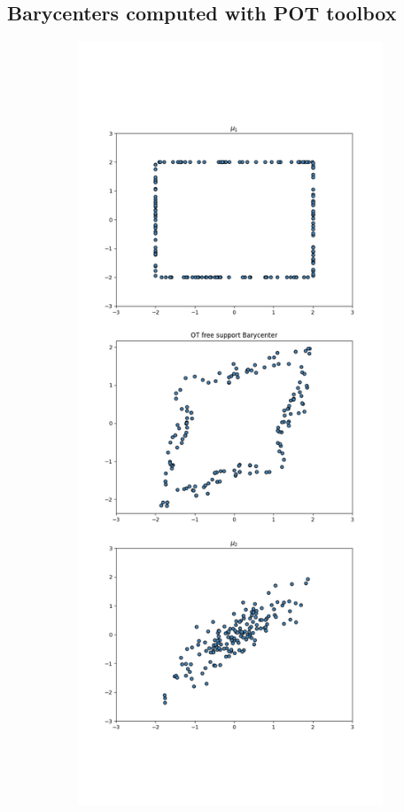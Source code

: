 \documentclass[a4paper, 11pt]{article}
\begin{document}
\subsection*{Barycenters computed with POT toolbox}
\begin{figure}[H]
    \begin{subfigure}{.5\textwidth}
        \centering
        \includegraphics[width=\textwidth]{figures/ot_barycenter_reg0.005.png}

\end{subfigure}
\end{figure}
\end{document}
